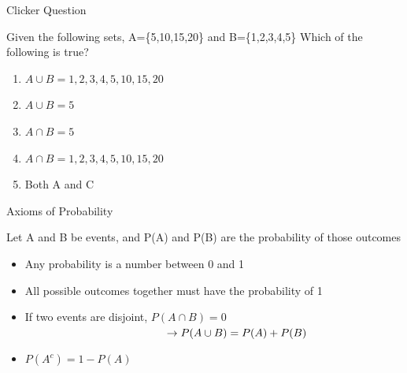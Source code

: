 \documentclass{beamer}
\begin{document}
\begin{frame}{Clicker Question}
	
	Given the following sets, A=\{5,10,15,20\} and B=\{1,2,3,4,5\}
	Which of the following is true?
	\begin{enumerate}[label=(\alph*)]
		\item $A \cup B ={1,2,3,4,5,10,15,20}$
		\item $A \cup B = {5}$
		\item $A \cap B = {5}$
		\item $A \cap B ={1,2,3,4,5,10,15,20}$
		\item Both A and C
	\end{enumerate}
	
\end{frame}

\begin{frame}{Axioms of Probability}
	
	Let A and B be events, and P(A) and P(B) are the probability of those outcomes
	\vspace{.2cm}
	\begin{itemize}
		\item Any probability is a number between 0 and 1
		\item All possible outcomes together must have the probability of 1
		\item If two events are disjoint, $P(A \cap B)=0$ \\  $\hspace{45mm} \rightarrow P(A \cup B) = P(A) + P(B)$
		\item $P(A^c)=1-P(A)$
	\end{itemize}
	
\end{frame}
\end{document}
